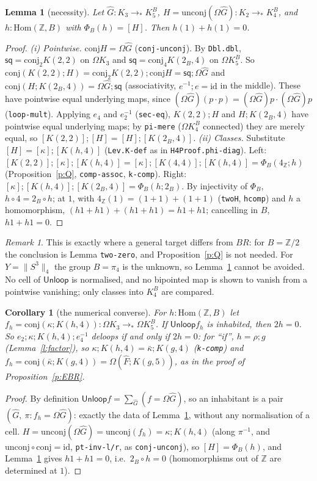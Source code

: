 \documentclass[11pt]{amsart}
\newtheorem{lemma}[theorem]{Lemma}
\newtheorem{corollary}[theorem]{Corollary}
\theoremstyle{definition}
\theoremstyle{remark}
\newtheorem{remark}[theorem]{Remark}
\newcommand{\Om}{\Omega}
\newcommand{\Z}{\mathbb{Z}}
\newcommand{\code}[1]{\texttt{#1}}
\newcommand{\lp}{\Omega}
\newcommand{\Hom}{\mathrm{Hom}}
\newcommand{\tr}[1]{\|#1\|}
\newcommand{\cls}[1]{[#1]}
\newcommand{\kb}{\bar\kappa}
\newcommand{\Fh}{\hat F}
\newcommand{\sq}{\mathsf{sq}}
\newcommand{\Unl}{\mathsf{Unloop}}
\newcommand{\cj}{\mathrm{conj}}
\newcommand{\ucj}{\mathrm{unconj}}
\begin{document}
\begin{lemma}[necessity]\label{l:N}
Let $\hat G:K_3\to_*K^B_5$, $H=\ucj(\lp\hat G):K_2\to_*K^B_4$, and
$h:\Hom(\Z,B)$ with $\Phi_B(h)=\cls H$. Then $h(1)+h(1)=0$.
\end{lemma}
\begin{proof}
\emph{(i) Pointwise.} $\cj H=\lp\hat G$ (\code{conj-unconj}). By
\code{Dbl.dbl}, $\sq=\cj_2K(2,2)$ on $\Om K_3$ and $\sq=\cj_4K(2_B,4)$ on
$\Om K^B_5$. So $\cj(K(2,2);H)=\cj_2K(2,2);\cj H=\sq;\lp\hat G$ and
$\cj(H;K(2_B,4))=\lp\hat G;\sq$ (associativity, $e^{-1};e=\mathrm{id}$ in the
middle). These have pointwise equal underlying maps, since
$(\lp\hat G)(p\cdot p)=(\lp\hat G)p\cdot(\lp\hat G)p$ (\code{loop-mult}).
Applying $e_4$ and $e_2^{-1}$ (\code{sec-eq}), $K(2,2);H$ and $H;K(2_B,4)$ have
pointwise equal underlying maps; by \code{pi-mere} ($\Om K^B_4$ connected) they are
merely equal, so $\cls{K(2,2)};\cls H=\cls H;\cls{K(2_B,4)}$.
\emph{(ii) Classes.} Substitute $\cls H=\cls\kappa;\cls{K(h,4)}$ (\code{Lev.K-def}
as in \code{H4Proof.phi-diag}). Left: $\cls{K(2,2)};\cls\kappa;\cls{K(h,4)}=
\cls\kappa;\cls{K(4,4)};\cls{K(h,4)}=\Phi_B(4_\Z;h)$ (Proposition~\ref{p:Q},
\code{comp-assoc}, \code{k-comp}). Right: $\cls\kappa;\cls{K(h,4)};\cls{K(2_B,4)}=\Phi_B(h;2_B)$.
By injectivity of $\Phi_B$, $h\circ4=2_B\circ h$; at $1$, with $4_\Z(1)=(1+1)+(1+1)$
(\code{twoH}, \code{hcomp}) and $h$ a homomorphism, $(h1+h1)+(h1+h1)=h1+h1$; cancelling
in $B$, $h1+h1=0$.
\end{proof}

\begin{remark}
This is exactly where a general target differs from $BR$: for $B=\Z/2$ the
conclusion is Lemma \code{two-zero}, and Proposition~\ref{p:Q} is not needed.
For $Y=\tr{S^3}_4$ the group $B=\pi_4$ is the unknown, so Lemma~\ref{l:N} cannot
be avoided. No cell of $\Unl$ is normalised, and no bipointed map is shown to
vanish from a pointwise vanishing; only classes into $K^B_4$ are compared.
\end{remark}

\begin{corollary}[the numerical converse]\label{c:conv}
For $h:\Hom(\Z,B)$ let $f_h=\cj(\kappa;K(h,4)):\Om K_3\to_*\Om K^B_5$. If
$\Unl f_h$ is inhabited, then $2h=0$. So $e_2;\kappa;K(h,4);e_4^{-1}$ deloops
if and only if $2h=0$: for ``if'', $h=\rho;g$ (Lemma~\ref{l:factor}), so
$\kappa;K(h,4)=\kb;K(g,4)$ (\code{k-comp}) and $f_h=\cj(\kb;K(g,4))=\lp(\Fh;K(g,5))$, as in
the proof of Proposition~\ref{p:EBR}.
\end{corollary}
\begin{proof}
By definition $\Unl f=\sum_{\hat G}(f=\lp\hat G)$, so an inhabitant is a pair
$(\hat G,\ \pi:f_h=\lp\hat G)$: exactly the data of Lemma~\ref{l:N}, without any
normalisation of a cell. $H=\ucj(\lp\hat G)=\ucj(f_h)=\kappa;K(h,4)$ (along
$\pi^{-1}$, and $\ucj\circ\cj=\mathrm{id}$, \code{pt-inv-l/r}, as
\code{conj-unconj}), so $\cls H=\Phi_B(h)$, and Lemma~\ref{l:N} gives
$h1+h1=0$, i.e.\ $2_B\circ h=0$ (homomorphisms out of $\Z$ are determined at $1$).
\end{proof}
\end{document}
